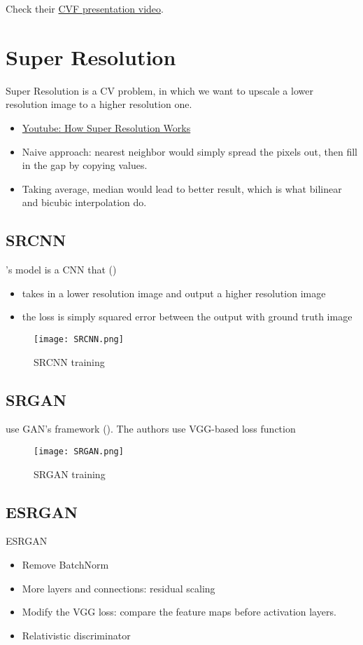 Check their \href{https://youtu.be/IIRxJvW6bE4}{CVF presentation video}.

\section{Super Resolution}
Super Resolution is a \ac{CV} problem, in which we want to upscale a lower resolution image to a higher resolution one.
\begin{itemize}
	\item \href{https://youtu.be/KULkSwLk62I}{Youtube: How Super Resolution Works}
	\item Naive approach: nearest neighbor would simply spread the pixels out, then fill in the gap by copying values.
	\item Taking average, median would lead to better result, which is what bilinear and bicubic interpolation do.
\end{itemize}

\subsection{SRCNN}
's model is a \ac{CNN} that ()
\begin{itemize}
	\item takes in a lower resolution image and output a higher resolution image
	\item the loss is simply squared error between the output with ground truth image
\end{itemize}

\begin{figure}[hbt!]
	\centering
	\texttt{[image: SRCNN.png]}
	\caption{\ac{SRCNN} training \cite{dong2015image}}
	\label{fig:SRCNN}
\end{figure}

\subsection{SRGAN}
 use \ac{GAN}'s framework (). The authors use VGG-based loss function

\begin{figure}[hbt!]
	\centering
	\texttt{[image: SRGAN.png]}
	\caption{\ac{SRGAN} training \cite{ledig2017photo}}
	\label{fig:SRGAN}
\end{figure}

\subsection{ESRGAN}
\ac{ESRGAN} \cite{wang2018esrgan}
\begin{itemize}
	\item Remove \ac{BatchNorm}
	\item More layers and connections: residual scaling
	\item Modify the VGG loss: compare the feature maps before activation layers.
	\item Relativistic discriminator
\end{itemize}

